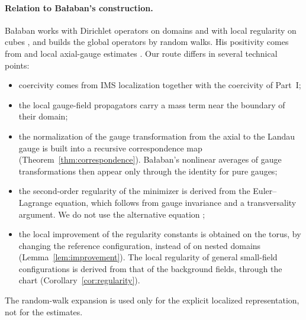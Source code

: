 \paragraph{Relation to Ba\l aban's construction.} Ba\l aban works with Dirichlet operators on domains \cite{BalBackground} and with local regularity on cubes \cite[(3.35)--(3.36)]{BalBackground}, and builds the global operators by random walks. His positivity comes from \cite[Theorem~3.11]{BalBackground} and local axial-gauge estimates \cite[Lemma~2.4]{BalPropII}. Our route differs in several technical points:
\begin{itemize}
\item coercivity comes from IMS localization together with the coercivity of Part~I;
\item the local gauge-field propagators carry a mass term near the boundary of their domain;
\item the normalization of the gauge transformation from the axial to the Landau gauge is built into a recursive correspondence map (Theorem~\ref{thm:correspondence}). Ba\l aban's nonlinear averages of gauge transformations then appear only through the identity for pure gauges;
\item the second-order regularity of the minimizer is derived from the Euler--Lagrange equation, which follows from gauge invariance and a transversality argument. We do not use the alternative equation \cite[(143)]{BalVar};
\item the local improvement of the regularity constants is obtained on the torus, by changing the reference configuration, instead of on nested domains (Lemma~\ref{lem:improvement}). The local regularity of general small-field configurations is derived from that of the background fields, through the chart (Corollary~\ref{cor:regularity}).
\end{itemize}
The random-walk expansion is used only for the explicit localized representation, not for the estimates.

